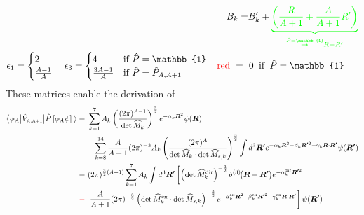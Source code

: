 \documentclass[aps,prd,onecolumn
,tightenlines,letterpaper,
notitlepage,11pt,
nofootinbib]{revtex4-1}
\begin{document}
\begin{align*}
&&&&B_k=&B'_k+\green{\underbrace{\left(\frac{R}{A+1}+\frac{A}{A+1}R'\right)}_{\stackrel{\hat{P}=\mathbb{1}}{\to}R-R'}}\\
&\epsilon_1=
  \begin{cases}
   2             \\
   \frac{A-1}{A} 
  \end{cases}
\epsilon_3=
  \begin{cases}
   4        & \text{if } \hat{P}=\mathbb{1} \\
   \frac{3A-1}{A}        & \text{if } \hat{P}=\hat{P}_{A,A+1}
  \end{cases}  
  &&\multispan3{$\red{\text{red}}~=~0\;\;\text{if}\;\;\hat{P}=\mathbb{1}$\hfil}\\
\end{align*}
\newpage
%
These matrices enable the derivation of
\begin{align}
\big\langle\phi_A\big\vert\hat{V}_\text{\tiny A,A+1}\big\vert\hat{P}\left[\phi_A\psi\right]\big\rangle=&~
\sum_{k=1}^7A_k\left(\frac{(2\pi)^{A-1}}{\det{\widehat{M}}_k}\right)^{\frac{3}{2}}
e^{-\alpha_k\boldsymbol{R}^2}\psi(\boldsymbol{R})\nonumber\\
&~\textcolor{red}{-}\sum_{k=8}^{14}\frac{A}{A+1}(2\pi)^{-3}A_k
\left(\frac{(2\pi)^A}{\det{\widehat{M}}_k\cdot\det{\widehat{M}}_{s,k}}\right)^{\frac{3}{2}}
\int d^3\boldsymbol{R'}e^{-\alpha_k\boldsymbol{R}^2-\beta_k\boldsymbol{R'}^2-\gamma_k\boldsymbol{R}\cdot\boldsymbol{R'}}\psi(\boldsymbol{R'})
\nonumber\\
=&~(2\pi)^{\frac{3}{2}(A-1)}\sum_{k=1}^7A_k\int d^3\boldsymbol{R'}\left[
\left(\det{\widehat{M}}_k^{\text{dir}}\right)^{-\frac{3}{2}}\delta^{(3)}\!\big(\boldsymbol{R}-\boldsymbol{R'}\big)
e^{-\alpha_k^{\text{dir}}\boldsymbol{R'}^2}
\right.\nonumber\\
\textcolor{red}{-}&~\left.
\frac{A}{A+1}(2\pi)^{-\frac{3}{2}}\left(\det{\widehat{M}}_k^{\text{ex}}\cdot
\det{\widehat{M}}_{s,k}\right)^{-\frac{3}{2}}
e^{-\alpha_k^{\text{ex}}\boldsymbol{R}^2-\beta_k^{\text{ex}}\boldsymbol{R'}^2-\gamma_k^{\text{ex}}\boldsymbol{R}\cdot\boldsymbol{R'}}
\right]\psi(\boldsymbol{R'})
\end{align}
%
\end{document}
